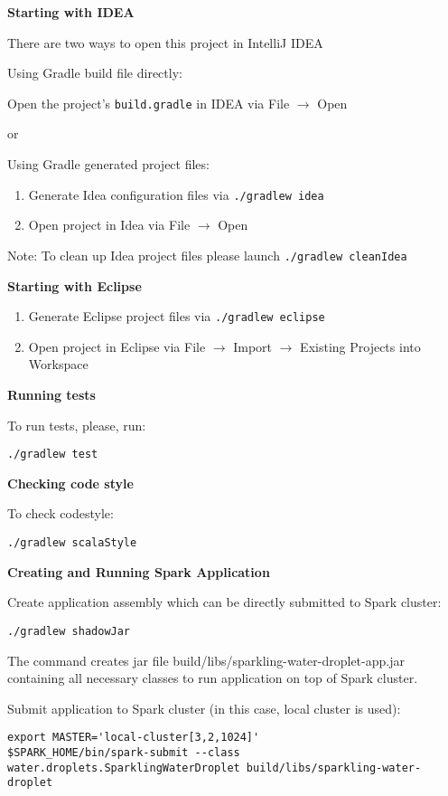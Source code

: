 \textbf{Starting with IDEA}

There are two ways to open this project in IntelliJ IDEA

Using Gradle build file directly:

Open the project's \texttt{build.gradle} in IDEA via File $\rightarrow$ Open

or

Using Gradle generated project files:

\begin{enumerate}
\item Generate Idea configuration files via  {\lstinline[style=Bash]|./gradlew idea|} 
\item Open project in Idea via File $\rightarrow$ Open
\end{enumerate}

Note: To clean up Idea project files please launch {\lstinline[style=Bash]|./gradlew cleanIdea|} 

\textbf{Starting with Eclipse}

\begin{enumerate}
\item Generate Eclipse project files via {\lstinline[style=Bash]|./gradlew eclipse|} 
\item Open project in Eclipse via File $\rightarrow$ Import $\rightarrow$ Existing Projects into Workspace
\end{enumerate}

\textbf{Running tests}

To run tests, please, run:

\begin{lstlisting}[style=Bash]
./gradlew test
\end{lstlisting}

\textbf{Checking code style}

To check codestyle:

\begin{lstlisting}[style=Bash]
./gradlew scalaStyle
\end{lstlisting}

\textbf{Creating and Running Spark Application}

Create application assembly which can be directly submitted to Spark cluster:

\begin{lstlisting}[style=Bash]
./gradlew shadowJar
\end{lstlisting}

The command creates jar file build/libs/sparkling-water-droplet-app.jar containing all necessary classes to run application on top of Spark cluster.

Submit application to Spark cluster (in this case, local cluster is used):

\begin{lstlisting}[style=Bash]
export MASTER='local-cluster[3,2,1024]'
$SPARK_HOME/bin/spark-submit --class water.droplets.SparklingWaterDroplet build/libs/sparkling-water-droplet
\end{lstlisting}


